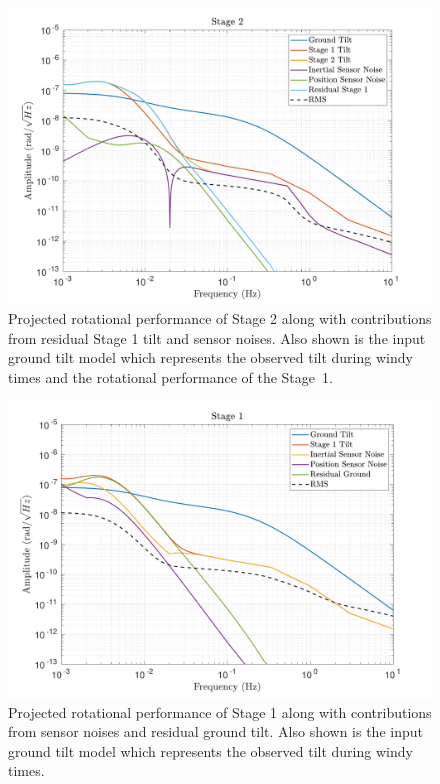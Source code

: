 \documentclass [12pt, proquest]{uwthesis}[2019]
\begin{document}
\begin{figure}[!h]
\begin{center}
\includegraphics[width=\textwidth]{cBRS_Model_ST2RX.pdf}
\caption[Projected rotational performance of Stage 2]{Projected rotational performance of Stage 2 along with contributions from residual Stage 1 tilt and sensor noises. Also shown is the input ground tilt model which represents the observed tilt during windy times and the rotational performance of the Stage~1.}
\label{cBRS2R}
\end{center}
\end{figure}

\begin{figure}[!h]
\begin{center}
\includegraphics[width=\textwidth]{cBRS_Model_ST1RX.pdf}
\caption[Projected rotational performance of Stage 1]{Projected rotational performance of Stage 1 along with contributions from sensor noises and residual ground tilt. Also shown is the input ground tilt model which represents the observed tilt during windy times.}
\label{cBRS1R}
\end{center}
\end{figure}
\end{document}
